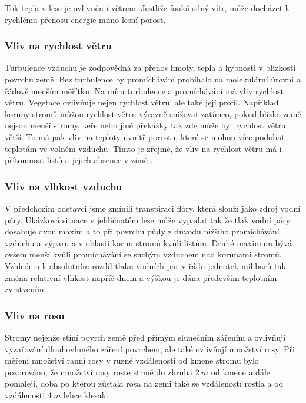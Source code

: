 Tok tepla v lese je ovlivněn i větrem. Jestliže fouká silný vítr, může docházet k rychlému přenosu energie mimo lesní porost\cite{alma}. 

\subsubsection{Vliv na rychlost větru}
Turbulence vzduchu je zodpovědná za přenos hmoty, tepla a hybnosti v blízkosti povrchu země. Bez turbulence by promíchávání probíhalo na molekulární úrovni a řádově menším měřítku. Na míru turbulence a promíchávání má vliv rychlost větru. Vegetace ovlivňuje nejen rychlost větru, ale také její profil. Například koruny stromů můžou rychlost větru výrazně snižovat zatímco, pokud blízko země nejsou menší stromy, keře nebo jiné překážky tak zde může být rychlost větru větší. To má pak vliv na teploty uvnitř porostu, které se mohou více podobat teplotám ve volném vzduchu. Tímto je zřejmé, že vliv na rychlost větru má i přítomnost listů a jejich absence v zimě \cite{alma}. 

\subsubsection{Vliv na vlhkost vzduchu}
V předchozím odstavci jsme zmínili transpiraci flóry, která slouží jako zdroj vodní páry. Ukázková situace v jehličnatém lese může vypadat tak že tlak vodní páry dosahuje dvou maxim a to při povrchu půdy z důvodu nižšího promíchávání vzduchu a výparu a v oblasti korun stromů kvůli listům. Druhé maximum bývá ovšem menší kvůli promíchávání se suchým vzduchem nad korunami stromů. Vzhledem k absolutním rozdíl tlaku vodních par v řádu jednotek milibarů tak změna relativní vlhkost napříč dnem a výškou je dána především teplotním zvrstvením \cite{alma}. 

\subsubsection{Vliv na rosu}
Stromy nejenže stíní povrch země před přímým slunečním zářením a ovlivňují vyzařování dlouhovlnného záření povrchem, ale také ovlivňují množství rosy. Při měření množství ranní rosy v různé vzdálenosti od kmene stromu bylo pozorováno, že množství rosy roste strmě do zhruba $\SI{2}{m}$ od kmene a dále pomaleji, doba po kterou zůstala rosa na zemi také se vzdáleností rostla a od vzdálenosti $\SI{4}{m}$ lehce klesala \cite{alma}.


